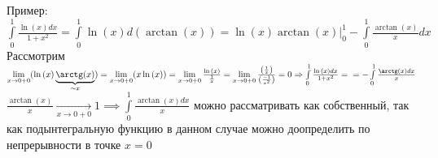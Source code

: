 \documentclass[../main.tex]{subfiles}
\begin{document}
Пример: $\int\limits_{0}^{1} \frac{\ln{(x)}dx}{1+x^{2}}=\int\limits_{0}^{1} \ln{(x)}d(\arctan(x))=\ln{(x)}\arctan{(x)}\bigg|_{0}^{1}- \int\limits_{0}^{1} \frac{\arctan{(x)}}{x}dx$
\\ Рассмотрим $\lim\limits_{x\to 0+0}(\ln{(x)}\underbrace{\arctan{(x)}}_{\sim x}) = \lim\limits_{x\to 0+0}(x\ln{(x)})=\lim\limits_{x\to 0+0} \frac{\ln{(x)}}{\frac{1}{x}}=\lim\limits_{x\to 0+0}\frac{\left(\frac{1}{x}\right)}{\left(\frac{-1}{x^{2}}\right)}=0 \implies \int\limits_{0}^{1} \frac{\ln{(x)}dx}{1+x^{2}}=\\=-\int\limits_{0}^{1} \frac{\arctan{(x)}dx}{x}  $
\\ $\frac{\arctan{(x)}}{x}\underset{x\to 0+0}{\to} 1\implies \int\limits_{0}^{1} \frac{\arctan{(x)}dx}{x}  $ можно рассматривать как собственный, так как подынтегральную функцию в данном случае можно доопределить по непрерывности в точке $x=0$  
\end{document}
